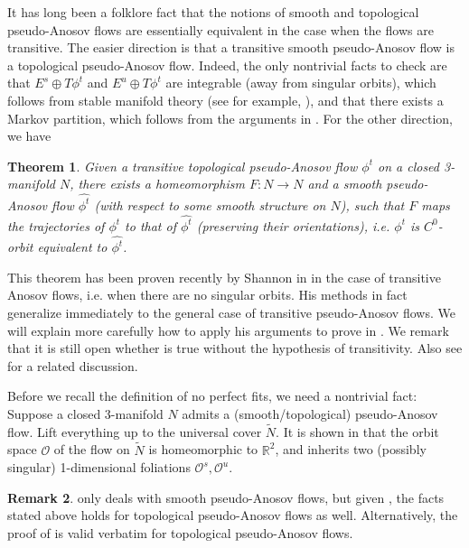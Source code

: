 \documentclass[12pt]{amsart}
\newtheorem{thm}{Theorem}[section]
\theoremstyle{definition}
\newtheorem{rmk}[thm]{Remark}
\numberwithin{equation}{section}
\begin{document}
It has long been a folklore fact that the notions of smooth and topological pseudo-Anosov flows are essentially equivalent in the case when the flows are transitive. The easier direction is that a transitive smooth pseudo-Anosov flow is a topological pseudo-Anosov flow. Indeed, the only nontrivial facts to check are that $E^s \oplus T\phi^t$ and $E^u \oplus T\phi^t$ are integrable (away from singular orbits), which follows from stable manifold theory (see for example, \cite[Chapter 17.4]{KH95}), and that there exists a Markov partition, which follows from the arguments in \cite[Section 2]{Rat73}. For the other direction, we have

\begin{thm} \label{thm:top2smooth}
Given a transitive topological pseudo-Anosov flow $\phi^t$ on a closed 3-manifold $N$, there exists a homeomorphism $F:N \to N$ and a smooth pseudo-Anosov flow $\hat{\phi^t}$ (with respect to some smooth structure on $N$), such that $F$ maps the trajectories of $\phi^t$ to that of $\hat{\phi^t}$ (preserving their orientations), i.e. $\phi^t$ is \textit{$C^0$-orbit equivalent} to $\hat{\phi^t}$.
\end{thm}

This theorem has been proven recently by Shannon in \cite{Sha21} in the case of transitive Anosov flows, i.e. when there are no singular orbits. His methods in fact generalize immediately to the general case of transitive pseudo-Anosov flows. We will explain more carefully how to apply his arguments to prove  in . We remark that it is still open whether  is true without the hypothesis of transitivity. Also see \cite[Section 3.1]{Mos96} for a related discussion. 

Before we recall the definition of no perfect fits, we need a nontrivial fact: Suppose a closed 3-manifold $N$ admits a (smooth/topological) pseudo-Anosov flow. Lift everything up to the universal cover $\widetilde{N}$. It is shown in \cite[Proposition 4.1]{FM01} that the orbit space $\mathcal{O}$ of the flow on $\widetilde{N}$ is homeomorphic to $\mathbb{R}^2$, and inherits two (possibly singular) 1-dimensional foliations $\mathcal{O}^s, \mathcal{O}^u$.

\begin{rmk}
\cite{FM01} only deals with smooth pseudo-Anosov flows, but given , the facts stated above holds for topological pseudo-Anosov flows as well. Alternatively, the proof of \cite[Proposition 4.1]{FM01} is valid verbatim for topological pseudo-Anosov flows.
\end{rmk}
\end{document}
